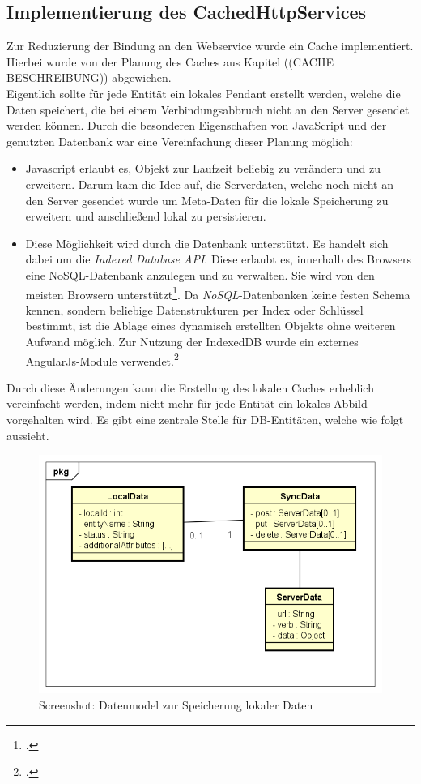 \subsection{Implementierung des CachedHttpServices}
\label{ssec:Implementierung-cachedHttpService}
Zur Reduzierung der Bindung an den Webservice wurde ein Cache implementiert. Hierbei wurde von der Planung des Caches aus Kapitel ((CACHE BESCHREIBUNG)) abgewichen. \\
Eigentlich sollte für jede Entität ein lokales Pendant erstellt werden, welche die Daten speichert, die bei einem Verbindungsabbruch nicht an den Server gesendet werden können. Durch die besonderen Eigenschaften von JavaScript und der genutzten Datenbank war eine Vereinfachung dieser Planung möglich:
\begin{itemize}
\item Javascript erlaubt es, Objekt zur Laufzeit beliebig zu verändern und zu erweitern. Darum kam die Idee auf, die Serverdaten, welche noch nicht an den Server gesendet wurde um Meta-Daten für die lokale Speicherung zu erweitern und anschließend lokal zu persistieren.
\item Diese Möglichkeit wird durch die Datenbank unterstützt. Es handelt sich dabei um die \textit{Indexed Database API}. Diese erlaubt es, innerhalb des Browsers eine \ac{NoSQL}-Datenbank anzulegen und zu verwalten. Sie wird von den meisten Browsern unterstützt\footcite{online:caniuse:indexedDB}. Da \textit{NoSQL}-Datenbanken keine festen Schema kennen, sondern beliebige Datenstrukturen per Index oder Schlüssel bestimmt, ist die Ablage eines dynamisch erstellten Objekts ohne weiteren Aufwand möglich. Zur Nutzung der IndexedDB wurde ein externes AngularJs-Module verwendet.\footcite{online:AngularJs:indexedDB}
\end{itemize}  
Durch diese Änderungen kann die Erstellung des lokalen Caches erheblich vereinfacht werden, indem nicht mehr für jede Entität ein lokales Abbild vorgehalten wird. Es gibt eine zentrale Stelle für DB-Entitäten, welche wie folgt aussieht.

\begin{figure}[h]
\centering
\includegraphics[width=0.8\linewidth]{content/images/DataModel-Cache-SPA}
\caption{Screenshot: Datenmodel zur Speicherung lokaler Daten}
\label{pic:DataModel-Cache-SPA}
\end{figure}

